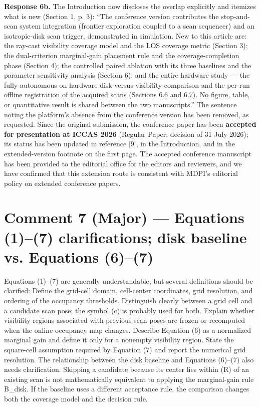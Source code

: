\textbf{Response 6b.} The Introduction now discloses the overlap explicitly and itemizes what is new (Section 1, p. 3):
“The conference version contributes the stop-and-scan system integration (frontier exploration coupled to a scan sequencer) and an isotropic-disk scan trigger, demonstrated in simulation. New to this article are: the ray-cast visibility coverage model and the LOS coverage metric (Section 3); the dual-criterion marginal-gain placement rule and the coverage-completion phase (Section 4); the controlled paired ablation with its three baselines and the parameter sensitivity analysis (Section 6); and the entire hardware study — the fully autonomous on-hardware disk-versus-visibility comparison and the per-run offline registration of the acquired scans (Sections 6.6 and 6.7). No figure, table, or quantitative result is shared between the two manuscripts.”
The sentence noting the platform’s absence from the conference version has been removed, as requested. Since the original submission, the conference paper has been \textbf{accepted for presentation at ICCAS 2026} (Regular Paper; decision of 31 July 2026); its status has been updated in reference [9], in the Introduction, and in the extended-version footnote on the first page. The accepted conference manuscript has been provided to the editorial office for the editors and reviewers, and we have confirmed that this extension route is consistent with MDPI’s editorial policy on extended conference papers.

\section*{Comment 7 (Major) — Equations (1)–(7) clarifications; disk baseline vs. Equations (6)–(7)}

\begin{quoting}
Equations (1)–(7) are generally understandable, but several definitions should be clarified: Define the grid-cell domain, cell-center coordinates, grid resolution, and ordering of the occupancy thresholds. Distinguish clearly between a grid cell and a candidate scan pose; the symbol (c) is probably used for both. Explain whether visibility regions associated with previous scan poses are frozen or recomputed when the online occupancy map changes. Describe Equation (6) as a normalized marginal gain and define it only for a nonempty visibility region. State the square-cell assumption required by Equation (7) and report the numerical grid resolution. The relationship between the disk baseline and Equations (6)–(7) also needs clarification. Skipping a candidate because its center lies within (R) of an existing scan is not mathematically equivalent to applying the marginal-gain rule B\_disk. If the baseline uses a different acceptance rule, the comparison changes both the coverage model and the decision rule.
\end{quoting}

